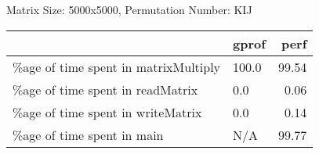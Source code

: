 \documentclass{article}
\begin{document}
    Matrix Size: 5000x5000, Permutation Number: KIJ \\
    \begin{tabular}{llr}
\hline
                                      & gprof   &   perf \\
\hline
 \%age of time spent in matrixMultiply & 100.0   &  99.54 \\
 \%age of time spent in readMatrix     & 0.0     &   0.06 \\
 \%age of time spent in writeMatrix    & 0.0     &   0.14 \\
 \%age of time spent in main           & N/A     &  99.77 \\
\hline
\end{tabular}
    
\end{document}
